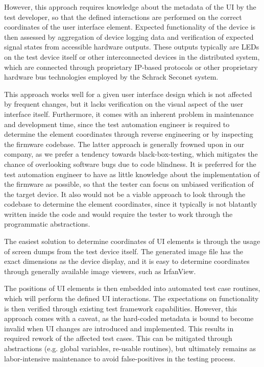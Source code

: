 \documentclass[Proposal,BIC,english,IEEE]{BASE/twbook} %
\begin{document}
However, this approach requires knowledge about the metadata of the UI by the test developer, so that the defined interactions are performed on the correct coordinates of the user interface element. Expected functionality of the device is then assessed by aggregation of device logging data and verification of expected signal states from accessible hardware outputs. These outputs typically are LEDs on the test device itself or other interconnected devices in the distributed system, which are connected through proprietary IP-based protocols or other proprietary hardware bus technologies employed by the Schrack Seconet system.

This approach works well for a given user interface design which is not affected by frequent changes, but it lacks verification on the visual aspect of the user interface itself. Furthermore, it comes with an inherent problem in maintenance and development time, since the test automation engineer is required to determine the element coordinates through reverse engineering or by inspecting the firmware codebase.
The latter approach is generally frowned upon in our company, as we prefer a tendency towards black-box-testing, which mitigates the chance of overlooking software bugs due to code blindness. It is preferred for the test automation engineer to have as little knowledge about the implementation of the firmware as possible, so that the tester can focus on unbiased verification of the target device.
It also would not be a viable approach to look through the codebase to determine the element coordinates, since it typically is not blatantly written inside the code and would require the tester to work through the programmatic abstractions.

The easiest solution to determine coordinates of UI elements is through the usage of screen dumps from the test device itself. The generated image file has the exact dimensions as the device display, and it is easy to determine coordinates through generally available image viewers, such as IrfanView\autocite{IrfanViewOfficialHomepage}.

The positions of UI elements is then embedded into automated test case routines, which will perform the defined UI interactions.
The expectations on functionality is then verified through existing test framework capabilities.
However, this approach comes with a caveat, as the hard-coded metadata is bound to become invalid when UI changes are introduced and implemented. This results in required rework of the affected test cases. This can be mitigated through abstractions (e.g. global variables, re-usable routines), but ultimately remains as labor-intensive maintenance to avoid false-positives in the testing process.
\end{document}

